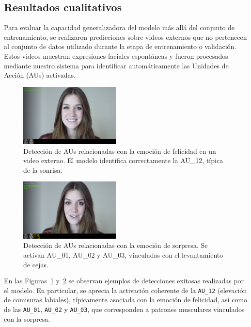 \documentclass[conference]{IEEEtran}
\begin{document}
\subsection{Resultados cualitativos}

Para evaluar la capacidad generalizadora del modelo más allá del conjunto de entrenamiento, se realizaron predicciones sobre videos externos que no pertenecen al conjunto de datos utilizado durante la etapa de entrenamiento o validación. Estos videos muestran expresiones faciales espontáneas y fueron procesados mediante nuestro sistema para identificar automáticamente las Unidades de Acción (AUs) activadas.


\begin{figure}[h]
    \centering
    \includegraphics[width=0.45\textwidth]{figs/qualitative_happy.png}
    \caption{Detección de AUs relacionadas con la emoción de felicidad en un video externo. El modelo identifica correctamente la AU\_12, típica de la sonrisa.}
    \label{fig:qualitative_happy}
\end{figure}

\begin{figure}[h]
    \centering
    \includegraphics[width=0.45\textwidth]{figs/qualitative_surprise.png}
    \caption{Detección de AUs relacionadas con la emoción de sorpresa. Se activan AU\_01, AU\_02 y AU\_03, vinculadas con el levantamiento de cejas.}
    \label{fig:qualitative_surprise}
\end{figure}

En las Figuras~\ref{fig:qualitative_happy} y~\ref{fig:qualitative_surprise} se observan ejemplos de detecciones exitosas realizadas por el modelo. En particular, se aprecia la activación coherente de la \texttt{AU\_12} (elevación de comisuras labiales), típicamente asociada con la emoción de felicidad, así como de las \texttt{AU\_01}, \texttt{AU\_02} y \texttt{AU\_03}, que corresponden a patrones musculares vinculados con la sorpresa.
\end{document}
